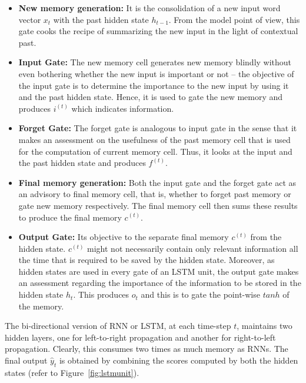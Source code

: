 \begin{itemize}
	\item \textbf{New memory generation: }It is the consolidation of a new input word vector $x_t$ with the past hidden state $h_{t-1}$. From the model point of view, this gate cooks the recipe of summarizing the new input in the light of contextual past.

	\item \textbf{Input Gate: }The new memory cell generates new memory blindly without even bothering whether the new input is important or not -- the objective of the input gate is to determine the importance to the new input by using it and the past hidden state. Hence, it is used to gate the new memory and produces $i^{(t)}$ which indicates information.

	\item \textbf{Forget Gate: }The forget gate is analogous to input gate in the sense that it makes an assessment on the usefulness of the past memory cell that is used for the computation of current memory cell. Thus, it looks at the input and the past hidden state and produces $f^{(t)}$.

	\item \textbf{Final memory generation: }Both the input gate and the forget gate act as an advisory to final memory cell, that is, whether to forget past memory or gate new memory respectively. The final memory cell then sums these results to produce the final memory $c^{(t)}$.

	\item \textbf{Output Gate: } Its objective to the separate final memory $c^{(t)}$ from the hidden state. $c^{(t)}$ might not necessarily contain only relevant information all the time that is required to be saved by the hidden state. Moreover, as hidden states are used in every gate of an LSTM unit, the output gate makes an assessment regarding the importance of the information to be stored in the hidden state $h_t$. This produces $o_t$ and this is to gate the point-wise $tanh$ of the memory.
\end{itemize}

The bi-directional version of RNN or LSTM, at each time-step $t$, maintains two hidden layers, one for left-to-right propagation and another for right-to-left propagation. Clearly, this consumes two times as much memory as RNNs. The final output $\widehat{y}_t$ is obtained by combining the scores computed by both the hidden states (refer to Figure~\ref{fig:lstmunit}).


